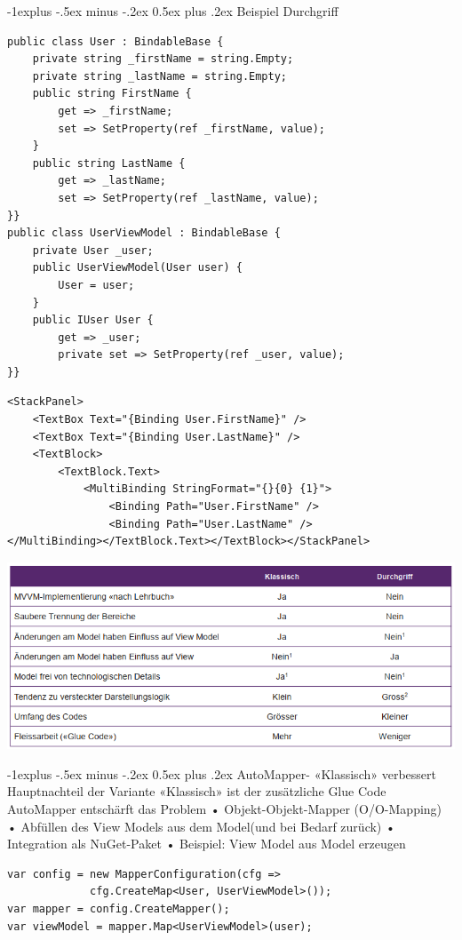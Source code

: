 \documentclass[10pt,landscape,a4paper]{article}
\makeatletter
\renewcommand{\subsection}{\@startsection{subsection}{2}{0mm}%
                                {-1explus -.5ex minus -.2ex}%
                                {0.5ex plus .2ex}%
                                {\normalfont\small\bfseries}}
\makeatother
\begin{document}
\begin{multicols*}{3}
\subsection{Beispiel Durchgriff}
\begin{verbatim}
public class User : BindableBase {
    private string _firstName = string.Empty;
    private string _lastName = string.Empty;
    public string FirstName {
        get => _firstName;
        set => SetProperty(ref _firstName, value);
    }
    public string LastName {
        get => _lastName;
        set => SetProperty(ref _lastName, value);
}}
public class UserViewModel : BindableBase {
    private User _user;
    public UserViewModel(User user) {
        User = user;
    }
    public IUser User {
        get => _user;
        private set => SetProperty(ref _user, value);
}}
\end{verbatim}
\begin{verbatim}
<StackPanel>
    <TextBox Text="{Binding User.FirstName}" />
    <TextBox Text="{Binding User.LastName}" />
    <TextBlock>
        <TextBlock.Text>
            <MultiBinding StringFormat="{}{0} {1}">
                <Binding Path="User.FirstName" />
                <Binding Path="User.LastName" />
</MultiBinding></TextBlock.Text></TextBlock></StackPanel>
\end{verbatim}

\includegraphics[scale=0.45]{images/MVVM_Klasisch_Durchgriff.PNG}

\subsection{AutoMapper- «Klassisch» verbessert}
Hauptnachteil der Variante «Klassisch» ist der zusätzliche Glue Code
AutoMapper entschärft das Problem
• Objekt-Objekt-Mapper (O/O-Mapping)
• Abfüllen des View Models aus dem Model(und bei Bedarf zurück)
• Integration als NuGet-Paket
• Beispiel: View Model aus Model erzeugen
\begin{verbatim}
var config = new MapperConfiguration(cfg => 
             cfg.CreateMap<User, UserViewModel>());
var mapper = config.CreateMapper();
var viewModel = mapper.Map<UserViewModel>(user);
\end{verbatim}


\end{multicols*}
\end{document}
